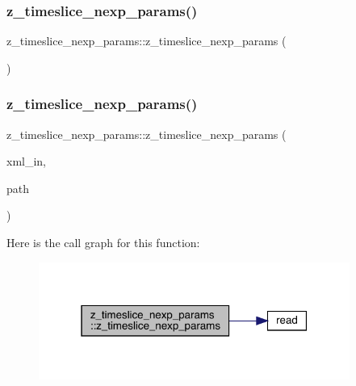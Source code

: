 \subsubsection{\texorpdfstring{z\_timeslice\_nexp\_params()}{z\_timeslice\_nexp\_params()}\hspace{0.1cm}{\footnotesize\ttfamily [1/4]}}
{\footnotesize\ttfamily z\+\_\+timeslice\+\_\+nexp\+\_\+params\+::z\+\_\+timeslice\+\_\+nexp\+\_\+params (\begin{DoxyParamCaption}{ }\end{DoxyParamCaption})\hspace{0.3cm}{\ttfamily [inline]}}

\mbox{\label{structz__timeslice__nexp__params_ac623b4d5088b21d5a8e5b2054a8c1fcf}} 
\subsubsection{\texorpdfstring{z\_timeslice\_nexp\_params()}{z\_timeslice\_nexp\_params()}\hspace{0.1cm}{\footnotesize\ttfamily [2/4]}}
{\footnotesize\ttfamily z\+\_\+timeslice\+\_\+nexp\+\_\+params\+::z\+\_\+timeslice\+\_\+nexp\+\_\+params (\begin{DoxyParamCaption}\item[{X\+M\+L\+Reader \&}]{xml\+\_\+in,  }\item[{const string \&}]{path }\end{DoxyParamCaption})}

Here is the call graph for this function\+:
\nopagebreak
\begin{figure}[H]
\begin{center}
\leavevmode
\includegraphics[width=289pt]{d8/d92/structz__timeslice__nexp__params_ac623b4d5088b21d5a8e5b2054a8c1fcf_cgraph}
\end{center}
\end{figure}
\mbox{\label{structz__timeslice__nexp__params_acd501dd79da744ce75663ef7788dd3e8}} 
